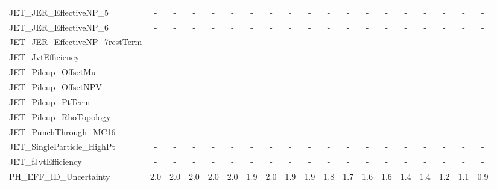 \begin{table}[h]
{\begin{tabular}{l | cccccccccccccccccc}
JET\_JER\_EffectiveNP\_5                     &     - &     - &     - &     - &     - &     - &     - &     - &     - &     - &     - &     - &     - &     - &     - &     - &     - &     - \\
JET\_JER\_EffectiveNP\_6                     &     - &     - &     - &     - &     - &     - &     - &     - &     - &     - &     - &     - &     - &     - &     - &     - &     - &     - \\
JET\_JER\_EffectiveNP\_7restTerm             &     - &     - &     - &     - &     - &     - &     - &     - &     - &     - &     - &     - &     - &     - &     - &     - &     - &     - \\
JET\_JvtEfficiency                         &     - &     - &     - &     - &     - &     - &     - &     - &     - &     - &     - &     - &     - &     - &     - &     - &     - &     - \\
JET\_Pileup\_OffsetMu                       &     - &     - &     - &     - &     - &     - &     - &     - &     - &     - &     - &     - &     - &     - &     - &     - &     - &     - \\
JET\_Pileup\_OffsetNPV                      &     - &     - &     - &     - &     - &     - &     - &     - &     - &     - &     - &     - &     - &     - &     - &     - &     - &     - \\
JET\_Pileup\_PtTerm                         &     - &     - &     - &     - &     - &     - &     - &     - &     - &     - &     - &     - &     - &     - &     - &     - &     - &     - \\
JET\_Pileup\_RhoTopology                    &     - &     - &     - &     - &     - &     - &     - &     - &     - &     - &     - &     - &     - &     - &     - &     - &     - &     - \\
JET\_PunchThrough\_MC16                     &     - &     - &     - &     - &     - &     - &     - &     - &     - &     - &     - &     - &     - &     - &     - &     - &     - &     - \\
JET\_SingleParticle\_HighPt                 &     - &     - &     - &     - &     - &     - &     - &     - &     - &     - &     - &     - &     - &     - &     - &     - &     - &     - \\
JET\_fJvtEfficiency                        &     - &     - &     - &     - &     - &     - &     - &     - &     - &     - &     - &     - &     - &     - &     - &     - &     - &     - \\
PH\_EFF\_ID\_Uncertainty                     &   2.0 &   2.0 &   2.0 &   2.0 &   2.0 &   1.9 &   2.0 &   1.9 &   1.9 &   1.8 &   1.7 &   1.6 &   1.6 &   1.4 &   1.4 &   1.2 &   1.1 &   0.9 \\

\end{tabular}}
\end{table}
